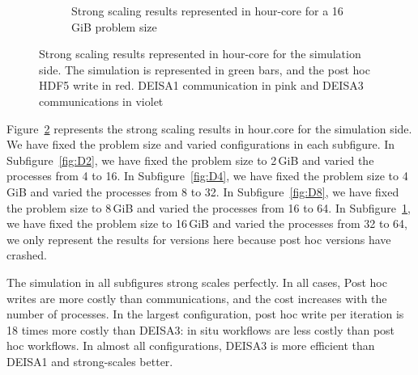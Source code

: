 \begin{figure}[h]
\begin{subfigure}[b]{0.4\textwidth}
         \caption{Strong scaling results represented in hour-core for a 16\,GiB problem size}
         \label{fig:D16}
     \end{subfigure}
        \caption{Strong scaling results represented in hour-core for the simulation side. The simulation is represented in green bars, and the post hoc HDF5 write in red. DEISA1 communication in pink and DEISA3 communications in violet}
        \label{fig:strong}
\end{figure}

Figure~\ref{fig:strong} represents the strong scaling results in  hour.core for the simulation side. We have fixed the problem size and varied configurations in each subfigure. 
In Subfigure~\ref{fig:D2}, we have fixed the problem size to 2\,GiB and varied the processes from 4 to 16.
In Subfigure~\ref{fig:D4}, we have fixed the problem size to 4\,GiB and varied the processes from 8 to 32.
In Subfigure~\ref{fig:D8}, we have fixed the problem size to 8\,GiB and varied the processes from 16 to 64.
In Subfigure~\ref{fig:D16}, we have fixed the problem size to 16\,GiB and varied the processes from 32 to 64, we only represent the results for \deisa versions here because post hoc versions have crashed.

The simulation in all subfigures strong scales perfectly. 
In all cases, Post hoc writes are more costly than \deisa communications, and the cost increases with the number of processes. In the largest configuration, post hoc write per iteration is 18 times more costly than DEISA3: in situ workflows are less costly than post hoc workflows.
In almost all configurations, DEISA3 is more efficient than DEISA1 and strong-scales better. 

